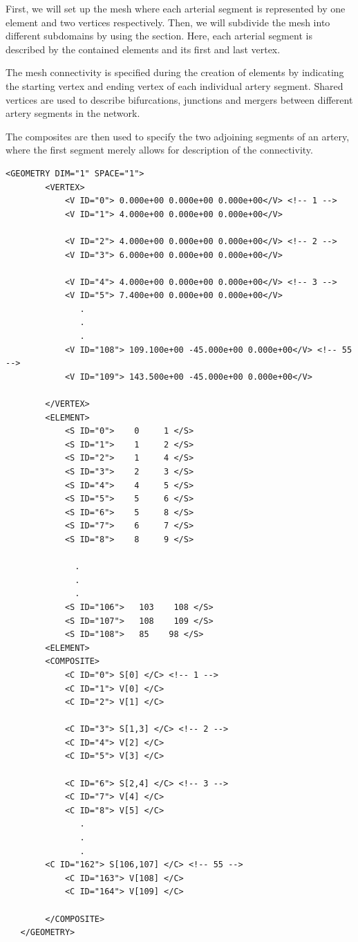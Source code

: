 First, we will set up the mesh where each arterial segment is represented by one
element and two vertices respectively. Then, we will subdivide the mesh into
different subdomains by using the  section. Here, each
arterial segment is described by the contained elements and its first and last
vertex.

The mesh connectivity is specified during the creation of elements by indicating
the starting vertex and ending vertex of each individual artery segment. Shared
vertices are used to describe bifurcations, junctions and mergers between
different artery segments in the network.

The composites are then used to specify the two adjoining segments of an artery,
where the first segment merely allows for description of the connectivity.

\begin{lstlisting}[style=XmlStyle]
    <GEOMETRY DIM="1" SPACE="1">
        <VERTEX>
            <V ID="0"> 0.000e+00 0.000e+00 0.000e+00</V> <!-- 1 -->
            <V ID="1"> 4.000e+00 0.000e+00 0.000e+00</V>
            
            <V ID="2"> 4.000e+00 0.000e+00 0.000e+00</V> <!-- 2 -->
            <V ID="3"> 6.000e+00 0.000e+00 0.000e+00</V>
            
            <V ID="4"> 4.000e+00 0.000e+00 0.000e+00</V> <!-- 3 -->
            <V ID="5"> 7.400e+00 0.000e+00 0.000e+00</V>
               .
               .
               .
            <V ID="108"> 109.100e+00 -45.000e+00 0.000e+00</V> <!-- 55 -->
            <V ID="109"> 143.500e+00 -45.000e+00 0.000e+00</V>

        </VERTEX>
        <ELEMENT>
            <S ID="0">    0     1 </S>
            <S ID="1">    1     2 </S>
            <S ID="2">    1     4 </S>
            <S ID="3">    2     3 </S>
            <S ID="4">    4     5 </S>
            <S ID="5">    5     6 </S>
            <S ID="6">    5     8 </S>
            <S ID="7">    6     7 </S>
            <S ID="8">    8     9 </S>

              .
              .
              .
            <S ID="106">   103    108 </S>
            <S ID="107">   108    109 </S>
            <S ID="108">   85    98 </S>
        <ELEMENT>
        <COMPOSITE>
            <C ID="0"> S[0] </C> <!-- 1 -->
            <C ID="1"> V[0] </C>
            <C ID="2"> V[1] </C>
            
            <C ID="3"> S[1,3] </C> <!-- 2 -->
            <C ID="4"> V[2] </C>
            <C ID="5"> V[3] </C> 
           
            <C ID="6"> S[2,4] </C> <!-- 3 -->
            <C ID="7"> V[4] </C>
            <C ID="8"> V[5] </C>
               .
               .
               .
        <C ID="162"> S[106,107] </C> <!-- 55 -->
            <C ID="163"> V[108] </C>
            <C ID="164"> V[109] </C>            

        </COMPOSITE>
   </GEOMETRY>
\end{lstlisting}

